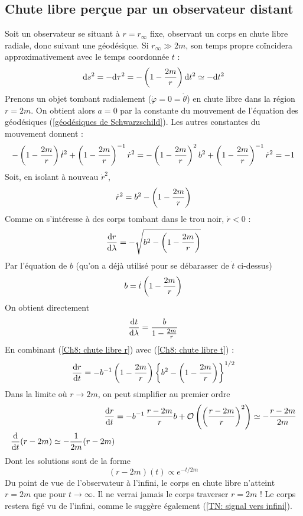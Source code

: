 \subsection{Chute libre perçue par un observateur distant}
Soit un observateur se situant à $r = r_\infty$ fixe, observant un corps en chute libre radiale, donc suivant une géodésique. Si $r_\infty\gg 2m$, son temps propre coïncidera approximativement avec le temps coordonnée $t$ : 
\begin{equation}
    \mathrm{d} s^2 = - \mathrm{d} \tau^2 = - \left( 1 - \frac{2m}{r} \right) \mathrm{d} t^2 \simeq - \mathrm{d} t^2
\end{equation}
Prenons un objet tombant radialement ($\dot{\varphi} = 0 = \dot \theta$) en chute libre dans la région $r=2m$. On obtient alors $a=0$ par la constante du mouvement de l'équation des géodésiques (\ref{géodésiques de Schwarzschild}). Les autres constantes du mouvement donnent :
\begin{align}
    - \left( 1 - \frac{2m}{r} \right) \dot{t}^2 + \left( 1 - \frac{2m}{r} \right)^{-1} \dot{r}^2 = - \left( 1 - \frac{2m}{r} \right)^2 b^2 + \left( 1 - \frac{2m}{r} \right)^{-1} \dot{r}^2 =-1
\end{align}
Soit, en isolant à nouveau $\dot{r}^2$,
\begin{equation}
    \dot{r}^2 = b^2 - \left( 1-\frac{2m}{r} \right)
\end{equation}
Comme on s'intéresse à des corps tombant dans le trou noir, $\dot{r}<0$ :
\begin{equation}
    \label{Ch8: chute libre r}
    \frac{\mathrm{d} r}{\mathrm{d} \lambda} = - \sqrt{b^2 - \left( 1 - \frac{2m}{r} \right)}
\end{equation}
Par l'équation de $b$ (qu'on a déjà utilisé pour se débarasser de $\dot{t}$ ci-dessus)
\begin{equation}
    b = \dot{t} \left( 1 - \frac{2m}{r} \right)
\end{equation}
On obtient directement
\begin{equation}
    \label{Ch8: chute libre t}
    \frac{\mathrm{d} t}{\mathrm{d} \lambda} = \frac{b}{1 - \frac{2m}{r}}
\end{equation}
En combinant (\ref{Ch8: chute libre r}) avec (\ref{Ch8: chute libre t}) :
\begin{align}
    \frac{\mathrm{d} r}{\mathrm{d} t} = - b^{-1} \left( 1 - \frac{2m}{r} \right) \left\{ b^2 - \left( 1 - \frac{2m}{r} \right) \right\}^{1/2}
\end{align}
Dans la limite où $r \to 2m$, on peut simplifier au premier ordre
\begin{align}
    \frac{\mathrm{d} r}{\mathrm{d} t} &= - b^{-1} \, \frac{r - 2m}{r} b + \mathcal{O}\left(\left(\frac{r-2m}{r}\right)^2\right) \simeq - \frac{r-2m}{2m}\\
    \frac{\mathrm{d} }{\mathrm{d} t}(r-2m) \simeq - \frac{1}{2m} (r-2m)
\end{align}
Dont les solutions sont de la forme
\begin{equation}
    (r-2m)(t) \propto e^{-t/2m}
\end{equation}
Du point de vue de l'observateur à l'infini, le corps en chute libre n'atteint $r=2m$ que pour $t \to \infty$. Il ne verrai jamais le corps traverser $r=2m$ ! Le corps restera figé vu de l'infini, comme le suggère également (\ref{TN: signal vers infini}).

